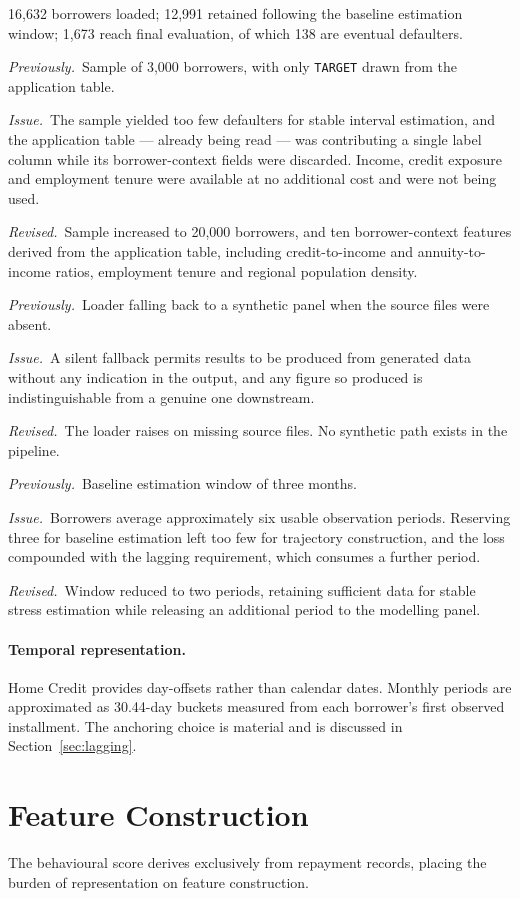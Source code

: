 \documentclass[11pt,a4paper]{article}
\newcommand{\designnote}[3]{%
  \par\vspace{7pt}
  \begin{list}{}{%
    \setlength{\leftmargin}{2em}\setlength{\rightmargin}{1em}%
    \setlength{\labelwidth}{0pt}\setlength{\labelsep}{0pt}%
    \setlength{\itemsep}{2pt}\setlength{\topsep}{0pt}%
    \setlength{\parsep}{0pt}}
    \item[]\textit{Previously.}~#1
    \item[]\textit{Issue.}~#2
    \item[]\textit{Revised.}~#3
  \end{list}
  \par\vspace{7pt}
}
\begin{document}
\vspace{6pt}

16,632 borrowers loaded; 12,991 retained following the baseline estimation window; 1,673
reach final evaluation, of which 138 are eventual defaulters.

\designnote{Sample of 3,000 borrowers, with only \texttt{TARGET} drawn from the
application table.}
{The sample yielded too few defaulters for stable interval estimation, and the
application table --- already being read --- was contributing a single label column while
its borrower-context fields were discarded. Income, credit exposure and employment tenure
were available at no additional cost and were not being used.}
{Sample increased to 20,000 borrowers, and ten borrower-context features derived from the
application table, including credit-to-income and annuity-to-income ratios, employment
tenure and regional population density.}

\designnote{Loader falling back to a synthetic panel when the source files were absent.}
{A silent fallback permits results to be produced from generated data without any
indication in the output, and any figure so produced is indistinguishable from a genuine
one downstream.}
{The loader raises on missing source files. No synthetic path exists in the pipeline.}

\designnote{Baseline estimation window of three months.}
{Borrowers average approximately six usable observation periods. Reserving three for
baseline estimation left too few for trajectory construction, and the loss compounded
with the lagging requirement, which consumes a further period.}
{Window reduced to two periods, retaining sufficient data for stable stress estimation
while releasing an additional period to the modelling panel.}

\paragraph{Temporal representation.} Home Credit provides day-offsets rather than
calendar dates. Monthly periods are approximated as 30.44-day buckets measured from each
borrower's first observed installment. The anchoring choice is material and is discussed
in Section~\ref{sec:lagging}.

\section{Feature Construction}

The behavioural score derives exclusively from repayment records, placing the burden of
representation on feature construction.
\end{document}
